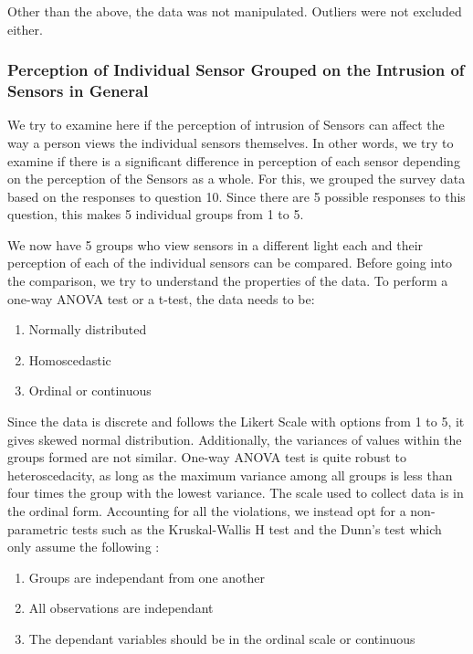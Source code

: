 Other than the above, the data was not manipulated. Outliers were not excluded either.

\subsubsection{Perception of Individual Sensor Grouped on the Intrusion of Sensors in General}
We try to examine here if the perception of intrusion  of Sensors can affect the way a person views the individual sensors themselves. In other
words, we try to examine if there is a significant difference in perception of each sensor depending on the perception of the Sensors as a whole.
For this, we grouped the survey data based on the responses to question 10. Since there are 5 possible responses to this question, this makes 5 individual groups from 1 to 5.

We now have 5 groups who view sensors in a different light each and their perception of each of the individual sensors can be compared. Before going into the comparison, we try to understand the properties of the data. To perform a one-way ANOVA test or a t-test, the data needs to be:

\begin{enumerate}
\item Normally distributed
\item Homoscedastic
\item Ordinal or continuous
\end{enumerate}

Since the data is discrete and follows the Likert Scale with options from 1 to 5, it gives skewed normal distribution. Additionally, the variances of values within the groups formed are not similar. One-way ANOVA test is quite robust to heteroscedacity, as long as the maximum variance among all groups is less than four times the group with the lowest variance. The scale used to collect data is in the ordinal form. Accounting for all the violations, we instead opt for a non-parametric tests such as the Kruskal-Wallis H test and the Dunn's test
which only assume the following : 

\begin{enumerate}
\item Groups are independant from one another
\item All observations are independant
\item The dependant variables should be in the ordinal scale or continuous
\end{enumerate}

